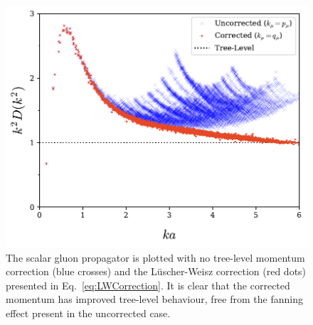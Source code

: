 \begin{figure}[H]
\centering
\includegraphics[width=\linewidth]{./ScalarGluComp_q2_MomentumComparison.pdf}
\caption[The renormalised scalar gluon propagator is plotted with no tree-level momentum correction and the L\"uscher-Weisz correction.]{\label{fig:MomentumComparison} The scalar gluon propagator is plotted with no tree-level momentum correction (blue crosses) and the L\"uscher-Weisz correction (red dots) presented in Eq.~\eqref{eq:LWCorrection}. It is clear that the corrected momentum has improved tree-level behaviour, free from the fanning effect present in the uncorrected case.}
\end{figure}
%


